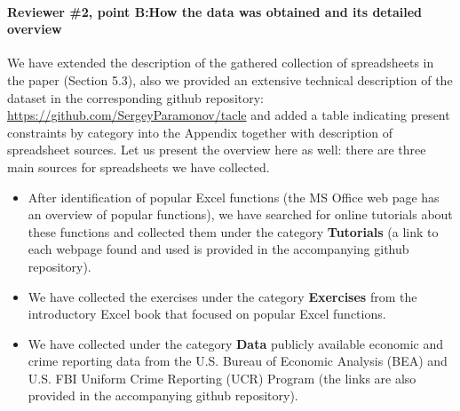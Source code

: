 \documentclass{article}
\begin{document}
\paragraph{Reviewer \#2, point B:How the data was obtained and its detailed overview}
We have extended the description of the gathered collection of spreadsheets in the paper (Section 5.3), also we provided an extensive technical description of the dataset in the corresponding github repository: \url{https://github.com/SergeyParamonov/tacle} and added a table indicating present constraints by category into the Appendix together with description of spreadsheet sources. Let us present the overview here as well: there are three main sources for spreadsheets we have collected.
\begin{itemize}
  \item After identification of popular Excel functions (the MS Office web page has an overview of popular functions), we have searched for online tutorials about these functions and collected them under the category \textbf{Tutorials} (a link to each webpage found and used is provided in the accompanying github repository).
  \item We have collected the exercises under the category \textbf{Exercises} from the introductory Excel book \cite{excel_book} that focused on popular Excel functions.
  \item We have collected under the category \textbf{Data} publicly available economic and crime reporting data from the U.S. Bureau of Economic Analysis (BEA) and U.S. FBI Uniform Crime Reporting (UCR) Program (the links are also provided in the accompanying github repository).
\end{itemize}
\end{document}
